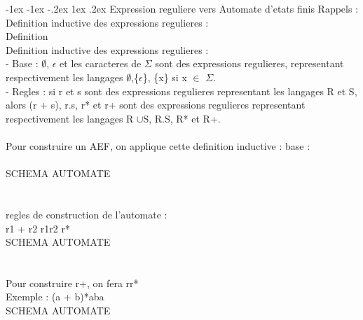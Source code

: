 \documentclass[5pt]{article}
\makeatletter
\renewcommand{\subsubsection}{\@startsection {section}{1}{\z@}%
             {-1ex \@plus -1ex \@minus -.2ex}%
             {1ex \@plus.2ex}%
             {\normalfont\scriptsize\sffamily\bfseries}}
\makeatother
\begin{document}
\begin{scriptsize}
\subsubsection{Expression reguliere vers Automate d'etats finis}
Rappels :\\
Definition inductive des expressions regulieres :\\
Definition\\
Definition inductive des expressions regulieres :\\
- Base : $\emptyset$, $\epsilon$ et les caracteres de $\Sigma$ sont des expressions regulieres, representant respectivement les langages $\emptyset$,\{$\epsilon$\}, \{x\} si x $\in$ $\Sigma$.\\
- Regles : si r et s sont des expressions regulieres representant les langages R et S, alors (r + s), r.s, r* et r+ sont des expressions regulieres representant respectivement les langages R $\cup$S, R.S, R* et R+.\\
\\
Pour construire un AEF, on applique cette definition inductive : base :\\
\\
SCHEMA AUTOMATE\\
\\
\\
regles de construction de l’automate :\\
r1 + r2
r1r2
r*
\\
SCHEMA AUTOMATE\\
\\
\\
Pour construire r+, on fera rr*
\\
Exemple : (a + b)*aba
\\
SCHEMA AUTOMATE\\
\\

\end{scriptsize}
\end{document}
